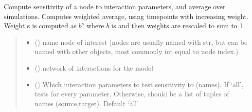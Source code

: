 \documentclass[letterpaper,10pt,english]{sphinxmanual}
\begin{document}
\begin{fulllineitems}
\label{\detokenize{sensit:sensitivity.get_all_sensitivity}}
\pysigstartsignatures
{}
\pysigstopsignatures
\sphinxAtStartPar
Compute sensitivity of a node to interaction parameters, and average over simulations. Computes weighted average, using   timepoints with increasing weight. Weight s is computed as \(b^s\) where \(b\) is  and then weights are rescaled to sum to 1.
\begin{quote}\begin{description}
\begin{itemize}
\item {} 
\sphinxAtStartPar
{} () \textendash{} name node of interest (nodes are usually named with str, but can be named with other objects, most commonly int equal to node index.)

\item {} 
\sphinxAtStartPar
{} ({\hyperref[\detokenize{friendlynets:friendlyNet.friendlyNet}]{}}) \textendash{} network of interactions for the model

\item {} 
\sphinxAtStartPar
{} (\sphinxstyleliteralemphasis{\sphinxupquote{{[}}}\sphinxstyleliteralemphasis{\sphinxupquote{{[}}}\sphinxstyleliteralemphasis{\sphinxupquote{,}}\sphinxstyleliteralemphasis{\sphinxupquote{{]}}}\sphinxstyleliteralemphasis{\sphinxupquote{{]}}}) \textendash{} Which interaction parameters to test sensitivity to (names). If ‘all’, tests for every parameter. Otherwise, should be a list of tuples of names (source,target). Default ‘all’


\end{itemize}
\end{description}
\end{quote}
\end{fulllineitems}
\end{document}
